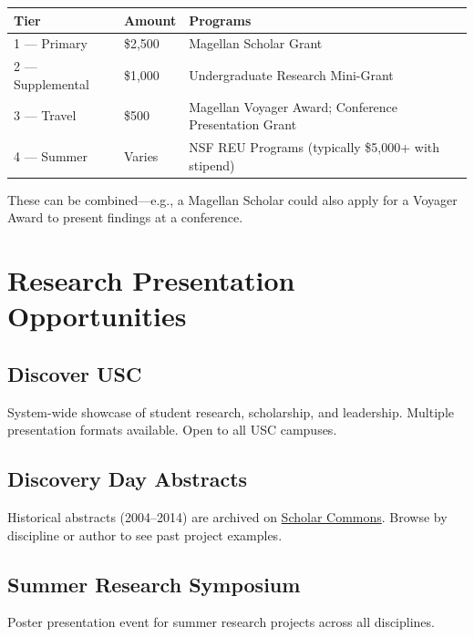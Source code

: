 \documentclass[11pt, letterpaper]{article}
\begin{document}
\begin{center}
\begin{tabularx}{\textwidth}{@{}l l X@{}}
\toprule
\textbf{Tier} & \textbf{Amount} & \textbf{Programs} \\
\midrule
1 --- Primary & \$2,500 & Magellan Scholar Grant \\
2 --- Supplemental & \$1,000 & Undergraduate Research Mini-Grant \\
3 --- Travel & \$500 & Magellan Voyager Award; Conference Presentation Grant \\
4 --- Summer & Varies & NSF REU Programs (typically \$5,000+ with stipend) \\
\bottomrule
\end{tabularx}
\end{center}

These can be combined---e.g., a Magellan Scholar could also apply for a Voyager Award to present findings at a conference.

\section{Research Presentation Opportunities}

\subsection{Discover USC}

System-wide showcase of student research, scholarship, and leadership. Multiple presentation formats available. Open to all USC campuses.

\subsection{Discovery Day Abstracts}

Historical abstracts (2004--2014) are archived on \href{https://scholarcommons.sc.edu/discoveryday/}{Scholar Commons}. Browse by discipline or author to see past project examples.

\subsection{Summer Research Symposium}

Poster presentation event for summer research projects across all disciplines.
\end{document}
